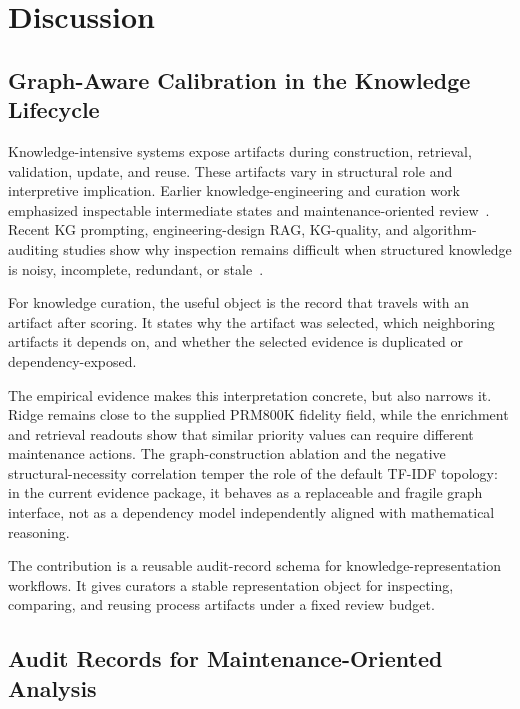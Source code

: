\section{Discussion}
\label{sec:discussion}

\subsection{Graph-Aware Calibration in the Knowledge Lifecycle}
\label{sec:knowledge-lifecycle}

Knowledge-intensive systems expose artifacts during construction, retrieval, validation, update, and reuse. These artifacts vary in structural role and interpretive implication. Earlier knowledge-engineering and curation work emphasized inspectable intermediate states and maintenance-oriented review~\cite{buchanan1984mycin,laird2012soar,studer1998knowledge,higgins2008dcc}. Recent KG prompting, engineering-design RAG, KG-quality, and algorithm-auditing studies show why inspection remains difficult when structured knowledge is noisy, incomplete, redundant, or stale~\cite{dai2025llmkg,siddharth2024retrieval,chen2025kgquality,dwivedi2021artificial,raji2020closing}.

For knowledge curation, the useful object is the record that travels with an artifact after scoring. It states why the artifact was selected, which neighboring artifacts it depends on, and whether the selected evidence is duplicated or dependency-exposed.

The empirical evidence makes this interpretation concrete, but also narrows it. Ridge remains close to the supplied PRM800K fidelity field, while the enrichment and retrieval readouts show that similar priority values can require different maintenance actions. The graph-construction ablation and the negative structural-necessity correlation temper the role of the default TF-IDF topology: in the current evidence package, it behaves as a replaceable and fragile graph interface, not as a dependency model independently aligned with mathematical reasoning.

The contribution is a reusable audit-record schema for knowledge-representation workflows. It gives curators a stable representation object for inspecting, comparing, and reusing process artifacts under a fixed review budget.

\subsection{Audit Records for Maintenance-Oriented Analysis}
\label{sec:audit-interpretation}

